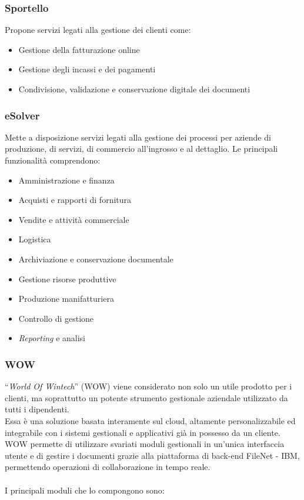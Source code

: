 \subsubsection*{Sportello}
Propone servizi legati alla gestione dei clienti come:  
\begin{itemize}
    \item Gestione della fatturazione online 
    \item Gestione degli incassi e dei pagamenti 
    \item Condivisione, validazione e conservazione digitale dei documenti  
\end{itemize}

\subsubsection*{eSolver}
Mette a disposizione servizi legati alla gestione dei processi per aziende di produzione, di servizi, di commercio all'ingrosso e al dettaglio. 
Le principali funzionalità comprendono: 
\begin{itemize}
    \item Amministrazione e finanza 
    \item Acquisti e rapporti di fornitura 
    \item Vendite e attività commerciale 
    \item Logistica
    \item Archiviazione e conservazione documentale
    \item Gestione risorse produttive 
    \item Produzione manifatturiera  
    \item Controllo di gestione 
    \item \emph{Reporting} e analisi 
\end{itemize}

\subsubsection*{WOW}
\label{WOW}
“\emph{World Of Wintech}” (WOW) viene considerato non solo un utile prodotto per i clienti, ma soprattutto un potente strumento gestionale aziendale utilizzato da tutti i dipendenti.\\ 
Essa è una soluzione basata interamente sul \gls{cloud}, altamente personalizzabile ed integrabile con i sistemi gestionali e applicativi già in possesso da un cliente.\\
WOW permette di utilizzare svariati moduli gestionali in un'unica interfaccia utente e di gestire i documenti grazie alla piattaforma di \gls{back-end} FileNet - IBM, permettendo operazioni di collaborazione in tempo reale.\\\\
I principali moduli che lo compongono sono: 

